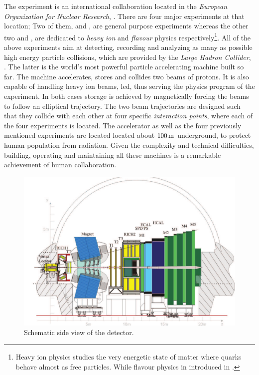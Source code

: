 
The \lhcb experiment is an international collaboration located in the {\it European Organization for Nuclear Research}, \cern.
There are four major experiments at that location; Two of them, \atlas and \cms, are general purpose experiments whereas the other
two \alice and \lhcb, are dedicated to {\it heavy ion} and {\it flavour} physics respectively\footnote{Heavy ion physics studies
the very energetic state of matter where quarks behave almost as free particles. While flavour physics in introduced in .}.
All of the above experiments aim at detecting, recording and analyzing as many as
possible high energy particle collisions, which are provided by the {\it Large Hadron Collider}, \lhc.
The latter is the world's most powerful particle accelerating machine built so far.
The \lhc machine accelerates, stores and collides two beams of protons. It is also capable of handling
heavy ion beams, \eg led, thus serving the physics program of the \alice experiment.
In both cases storage is achieved by magnetically forcing the beams to follow an elliptical trajectory.
The two beam trajectories are designed such that they collide with each other at four specific {\it interaction points},
where each of the four experiments is located. The \lhc accelerator as well as the four previously mentioned
experiments are located located about $100\rm \,m$ underground, to protect human population from radiation.
Given the complexity and technical difficulties, building, operating and maintaining all these machines
is a remarkable achievement of human collaboration.

\begin{figure}[t]
  \centering
  \includegraphics[width=\textwidth]{Figures/Chapter2/detector_cross_cmyk}
  \caption{Schematic side view of the \lhcb detector.}
  \label{lhcb_detector_cross_section}
\end{figure}

